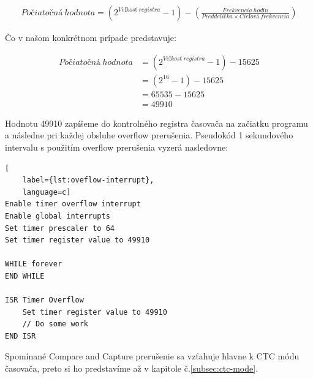 \begin{equation} \label{eq:start-value}
    \begin{aligned}
        Počiatočná\:hodnota =  (2^{Veľkosť\:registra} - 1) - (\frac{Frekvencia\:hodín}{Preddelička \times Cieľová\:frekvencia})
    \end{aligned}
\end{equation}

Čo v našom konkrétnom prípade predstavuje:

\begin{equation}
    \begin{aligned}
        Počiatočná\:hodnota & =  (2^{Veľkosť\:registra} - 1) - 15625 \\
                            & =  (2^{16} - 1) - 15625                \\
                            & =  65535 - 15625                       \\
                            & =  49910
    \end{aligned}
\end{equation}

Hodnotu 49910 zapíšeme do kontrolného registra časovača na začiatku programu a následne pri
každej obsluhe overflow prerušenia. Pseudokód 1 sekundového intervalu s použitím overflow prerušenia vyzerá nasledovne:

\begin{lstlisting}[
    label={lst:oveflow-interrupt},
    language=c]  
Enable timer overflow interrupt
Enable global interrupts
Set timer prescaler to 64
Set timer register value to 49910

WHILE forever
END WHILE

ISR Timer Overflow
    Set timer register value to 49910
    // Do some work
END ISR

\end{lstlisting}

Spomínané Compare and Capture prerušenie sa vzťahuje hlavne k \acrshort{CTC} módu časovača, preto si ho predstavíme až v kapitole č.\ref{subsec:ctc-mode}.

